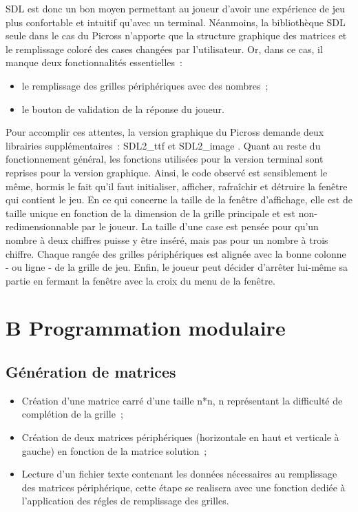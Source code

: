 \documentclass[a4paper,11pt]{article}
\begin{document}
SDL est donc un bon moyen permettant au joueur d’avoir une expérience de jeu plus confortable et intuitif qu'avec un terminal. Néanmoins, la bibliothèque SDL seule dans le cas du Picross n’apporte que la structure graphique des matrices et le remplissage coloré des cases changées par l’utilisateur. Or, dans ce cas, il manque deux fonctionnalités essentielles~:\medbreak
\begin{itemize}[label=$\square$]
	\item le remplissage des grilles périphériques avec des nombres~;
	\item le bouton de validation de la réponse du joueur.
\end{itemize}\bigbreak
Pour accomplir ces attentes, la version graphique du Picross demande deux librairies supplémentaires~: \og SDL2\_ttf \fg{} et \og SDL2\_image \fg{}. Quant au reste du fonctionnement général, les fonctions utilisées pour la version \og terminal \fg{} sont reprises pour la version graphique.\medbreak
Ainsi, le code observé est sensiblement le même, hormis le fait qu’il faut initialiser, afficher, rafraîchir et détruire la fenêtre qui contient le jeu. En ce qui concerne la taille de la fenêtre d’affichage, elle est de taille unique en fonction de la dimension de la grille principale et est non-redimensionnable par le joueur. La taille d’une case est pensée pour qu’un nombre à deux chiffres puisse y être inséré, mais pas pour un nombre à trois chiffre. Chaque rangée des grilles périphériques est alignée avec la bonne colonne - ou ligne - de la grille de jeu. Enfin, le joueur peut décider d’arrêter lui-même sa partie en fermant la fenêtre avec la croix du menu de la fenêtre.
\section*{B \hspace*{0.3cm} Programmation modulaire}
\label{section:programmation_modulaire}
\subsection{Génération de matrices}
\begin{itemize}[label=$\square$]
	\item Création d'une matrice carré d'une taille n*n, n représentant la difficulté de complétion de la grille~;
	\item Création de deux matrices périphériques (horizontale en haut et verticale à gauche) en fonction de la matrice solution~;
	\item Lecture d'un fichier texte contenant les données nécessaires au remplissage des matrices périphérique, cette étape se realisera avec une fonction dediée à l'application
	des régles de remplissage des grilles.
\end{itemize}
\end{document}

